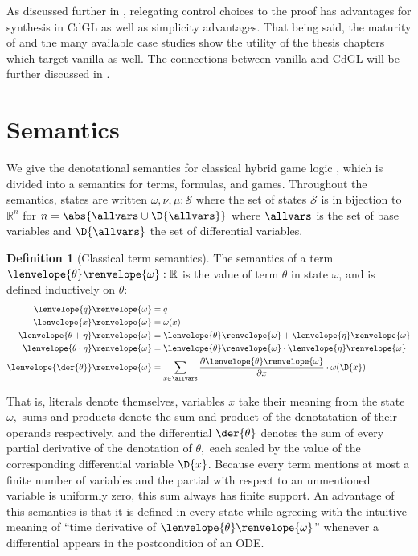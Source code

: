 \documentclass[12pt]{cmuthesis}
\theoremstyle{definition}
\newtheorem{definition}{Definition}
\theoremstyle{remark}
\newcommand{\rref}[2][]{\prettyref{#2}}
\newcommand{\allstate}{\mathcal{S}}
\newcommand{\om}{\omega}
\newcommand{\CdGL}{\textsf{CdGL}\xspace}
\newcommand{\tint}[2]{\lenvelope{#1}\renvelope{#2}}
\begin{document}
As discussed further in \rref{ch:cdgl}, relegating control choices to the proof has advantages for synthesis in \CdGL as well as simplicity advantages.
That being said, the maturity of \KeYmaeraX and the many available case studies show the utility of the thesis chapters which target vanilla \dL as well.
The connections between vanilla \dL and \CdGL will be further discussed in \rref{ch:cdgl}.

\section{Semantics}
\label{sec:dgl-semantics}
We give the denotational semantics for classical hybrid game logic \dGL, which is divided into a semantics for terms, formulas, and games.
Throughout the semantics, states are written $\omega, \nu, \mu : \allstate$ where the set of states $\allstate$ is in bijection to $\mathbb{R}^n$ for $n = \abs{\allvars \cup \D{\allvars}}$ where $\allvars$ is the set of base variables and $\D{\allvars}$ the set of differential variables.

\begin{definition}[Classical term semantics]\label{def:dgl-sem-term}
The semantics of a term $\tint{\theta}{\om} : \mathbb{R}$ is the value of term $\theta$ in state $\om$, and is defined inductively on $\theta$:
\begin{align*}
  \tint{q}{\om} &= q \\
  \tint{x}{\om} &= \om(x)\\
  \tint{\theta + \eta}{\om} &= \tint{\theta}{\om} + \tint{\eta}{\om}\\
  \tint{\theta \cdot \eta}{\om} &= \tint{\theta}{\om} \cdot \tint{\eta}{\om}\\
  \tint{\der{\theta}}{\om} &= \sum_{x \in \allvars} \frac{\partial \tint{\theta}{\om}}{\partial x} \cdot \omega(\D{x})
\end{align*}
\end{definition}
That is, literals denote themselves, variables $x$ take their meaning from the state $\om,$ sums and products denote the sum and product of the denotatation of their operands respectively, and the differential $\der{\theta}$ denotes the sum of every partial derivative of the denotation of $\theta,$ each scaled by the value of the corresponding differential variable $\D{x}$.
Because every term mentions at most a finite number of variables and the partial with respect to an unmentioned variable is uniformly zero, this sum always has finite support.
An advantage of this semantics is that it is defined in every state while agreeing with the intuitive meaning of ``time derivative of $\tint{\theta}{\om}$'' whenever a differential appears in the postcondition of an ODE.
\end{document}
